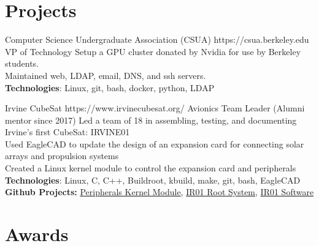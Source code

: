 \documentclass[10pt]{article} %
\begin{document}
\section{Projects}

{Computer Science Undergraduate Association (CSUA)}
{https://csua.berkeley.edu}
{VP of Technology}
{
Setup a GPU cluster donated by Nvidia for use by Berkeley students. \\
Maintained web, LDAP, email, DNS, and ssh servers. \\[5pt]
\textbf{Technologies}: Linux, git, bash, docker, python, LDAP
}

{Irvine CubeSat}
{https://www.irvinecubesat.org/}
{Avionics Team Leader (Alumni mentor since 2017)}
{
Led a team of 18 in assembling, testing, and documenting Irvine's first CubeSat: IRVINE01 \\
Used EagleCAD to update the design of an expansion card for connecting solar arrays and propulsion systems \\
Created a Linux kernel module to control the expansion card and peripherals \\[5pt]
\textbf{Technologies}: Linux, C, C++, Buildroot, kbuild, make, git, bash, EagleCAD \\
\textbf{Github Projects:}
	\href{https://github.com/mark64/ccardmodule}{Peripherals Kernel Module},
	\href{https://github.com/mark64/buildroot}{IR01 Root System},
	\href{https://github.com/irvinecubesat/irvine-01-sw}{IR01 Software}
}




\section{Awards}
\end{document}
